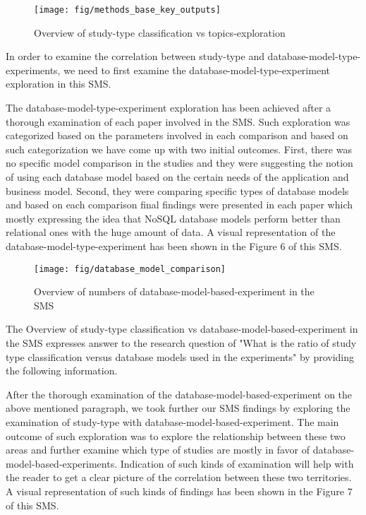 \documentclass[sigconf,nonacm]{acmart}
\begin{document}
\begin{figure}[H]
  \centering
  \texttt{[image: fig/methods\_base\_key\_outputs]}
  \caption{Overview of study-type classification vs topics-exploration}
\end{figure}

In order to examine the correlation between study-type and database-model-type-experiments, we need to first examine the database-model-type-experiment exploration in this SMS.

The database-model-type-experiment exploration has been achieved after a thorough examination of each paper involved in the SMS. Such exploration was categorized based on the parameters involved in each comparison and based on such categorization we have come up with two initial outcomes. First,  there was no specific model comparison in the studies and they were suggesting the notion of using each database model based on the certain needs of the application and business model. Second, they were  comparing specific types of database models and based on each comparison final findings were presented in each paper which mostly expressing the idea that NoSQL database models perform better than relational ones with the huge amount of data\cite{2,5,9,14}. A visual representation of the database-model-type-experiment has been shown in the Figure 6 of this SMS. 

\begin{figure}[H]
  \centering
  \texttt{[image: fig/database\_model\_comparison]}
  \caption{Overview of numbers of database-model-based-experiment in the SMS}
\end{figure}

The Overview of study-type classification vs database-model-based-experiment in the SMS expresses answer to the research question of "What is the ratio of study type classification versus database models used in the experiments" by providing the following information.

After the thorough examination of the database-model-based-experiment on the above mentioned paragraph, we took further our SMS findings by exploring the examination of study-type with database-model-based-experiment. The main outcome of such exploration was to explore the relationship between these two areas and further examine which type of studies are mostly in favor of database-model-based-experiments. Indication of such kinds of examination will help with the reader to get a clear picture of the correlation between these two territories. A visual representation of such kinds of findings has been shown in the Figure 7 of this SMS.  
\end{document}
